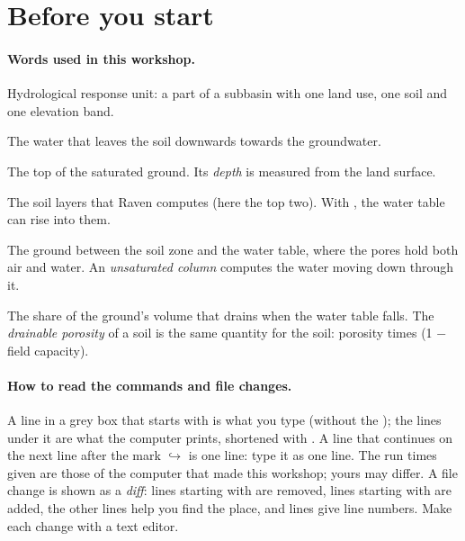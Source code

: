 \section{Before you start}
\paragraph{Words used in this workshop.}
\begin{description}[itemsep=1pt]
\item[HRU] Hydrological response unit: a part of a subbasin with one land use, one soil and one elevation band.
\item[Recharge] The water that leaves the soil downwards towards the groundwater.
\item[Water table] The top of the saturated ground. Its \emph{depth} is measured from the land surface.
\item[Soil zone] The soil layers that Raven computes (here the top two). With , the water table
  can rise into them.
\item[Unsaturated zone] The ground between the soil zone and the water table, where the pores hold both air and water.
  An \emph{unsaturated column} computes the water moving down through it.
\item[Specific yield] The share of the ground's volume that drains when the water table falls. The \emph{drainable
  porosity} of a soil is the same quantity for the soil: porosity times (1 $-$ field capacity).
\end{description}

\paragraph{How to read the commands and file changes.} A line in a grey box that starts with \cmd{\$} is what you type
(without the \cmd{\$}); the lines under it are what the computer prints, shortened with . A line that continues on the next line after the mark $\hookrightarrow$ is one line: type it
as one line. The run times given are those of the computer that made this workshop; yours may differ. A file change is shown as
a \emph{diff}: lines starting with \cmd{-} are removed, lines starting with \cmd{+} are added, the other lines help you find
the place, and  lines give line numbers. Make each change with a text editor.
